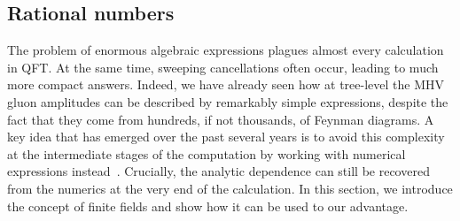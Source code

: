 \documentclass[main.tex]{subfiles}
\begin{document}
\subsection{Rational numbers} \label{sec:ratnums}
The problem of enormous algebraic expressions plagues almost every calculation in QFT. At the same time, sweeping cancellations often occur, leading to much more compact answers. Indeed, we have already seen how at tree-level the MHV gluon amplitudes can be described by remarkably simple expressions, despite the fact that they come from hundreds, if not thousands, of Feynman diagrams. A key idea that has emerged over the past several years is to avoid this complexity at the intermediate stages of the computation by working with numerical expressions instead~\cite{Peraro:2016wsq, Peraro:2019svx, Klappert:2019emp, Klappert:2020aqs, vonManteuffel:2014ixa, Abreu:2020xvt}. Crucially, the analytic dependence can still be recovered from the numerics at the very end of the calculation. In this section, we introduce the concept of finite fields and show how it can be used to our advantage.
\end{document}
